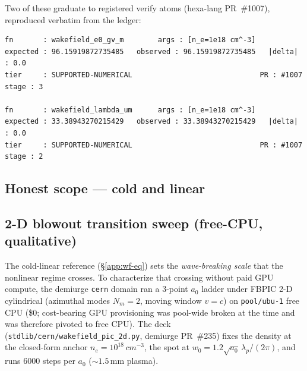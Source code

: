 Two of these graduate to registered verify atoms (hexa-lang PR~\#1007),
reproduced verbatim from the ledger:

\begin{lstlisting}
fn       : wakefield_e0_gv_m        args : [n_e=1e18 cm^-3]
expected : 96.15919872735485   observed : 96.15919872735485   |delta| : 0.0
tier     : SUPPORTED-NUMERICAL                              PR : #1007  stage : 3

fn       : wakefield_lambda_um      args : [n_e=1e18 cm^-3]
expected : 33.38943270215429   observed : 33.38943270215429   |delta| : 0.0
tier     : SUPPORTED-NUMERICAL                              PR : #1007  stage : 2
\end{lstlisting}

\subsection{Honest scope --- cold and linear}
\label{app:wf-honesty}

\noindent{}

\subsection{2-D blowout transition sweep (free-CPU, qualitative)}
\label{app:wf-blowout}

The cold-linear reference (\S\ref{app:wf-eq}) sets the
\emph{wave-breaking scale} that the nonlinear regime crosses. To
characterize that crossing without paid GPU compute, the demiurge
\texttt{cern} domain ran a 3-point $a_0$ ladder under FBPIC 2-D
cylindrical (azimuthal modes $N_m\!=\!2$, moving window $v\!=\!c$) on
\texttt{pool/ubu-1} free CPU (\$0; cost-bearing GPU provisioning was
pool-wide broken at the time and was therefore pivoted to free CPU).
The deck (\verb|stdlib/cern/wakefield_pic_2d.py|, demiurge PR~\#235)
fixes the density at the closed-form anchor $n_e\!=\!10^{18}\,\si{cm^{-3}}$,
the spot at $w_0\!=\!1.2\sqrt{a_0}\,\lambda_p/(2\pi)$, and runs 6000
steps per $a_0$ ($\sim\!1.5$\,mm plasma).

